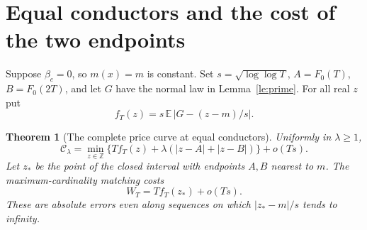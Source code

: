 \documentclass[11pt]{article}
\newtheorem{theorem}{Theorem}
\newcommand{\E}{\mathbb E}
\newcommand{\cost}{\mathcal C}
\begin{document}
\section{Equal conductors and the cost of the two endpoints}
Suppose $\beta_c=0$, so $m(x)=m$ is constant. Set $s=\sqrt{\log\log T}$,
$A=F_0(T)$, $B=F_0(2T)$, and let $G$ have the normal law in Lemma~\ref{le:prime}.
For all real $z$ put
\[
 f_T(z)=s\,\E\,|G-(z-m)/s|.
\]
\begin{theorem}[The complete price curve at equal conductors]
Uniformly in $\lambda\ge1$,
\[
 \cost_\lambda=\min_{z\in\mathbb Z}
  \{T f_T(z)+\lambda(|z-A|+|z-B|)\}+o(Ts).
\]
Let $z_*$ be the point of the closed interval with endpoints $A,B$ nearest to $m$. The maximum-cardinality matching costs
\[
 W_T=T f_T(z_*)+o(Ts).
\]
These are absolute errors even along sequences on which $|z_*-m|/s$ tends to infinity.
\end{theorem}
\end{document}

